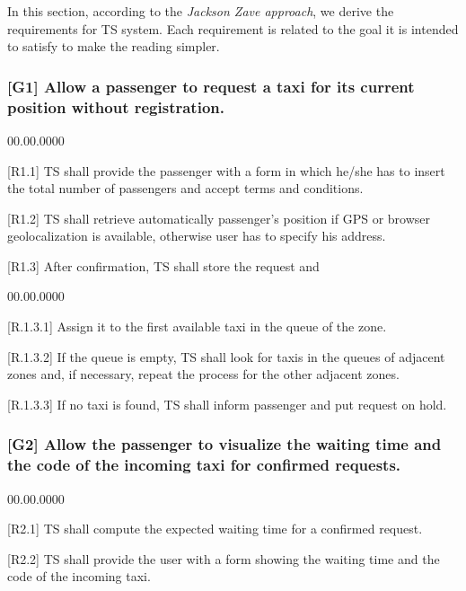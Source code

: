 In this section, according to the \emph{Jackson Zave approach}, we
derive the requirements for TS system. Each requirement is related
to the goal it is intended to satisfy to make the reading simpler.


\subsubsection{{[}G1{]} Allow a passenger to request a taxi for its current position
without registration.}
\begin{lyxlist}{00.00.0000}
\item [{{[}R1.1{]}}] TS shall provide the passenger with a form in which
he/she has to insert the total number of passengers and accept terms
and conditions.
\item [{{[}R1.2{]}}] TS shall retrieve automatically passenger's position
if GPS or browser geolocalization is available, otherwise user has
to specify his address.
\item [{{[}R1.3{]}}] After confirmation, TS shall store the request and 

\begin{lyxlist}{00.00.0000}
\item [{{[}R.1.3.1{]}}] Assign it to the first available taxi in the queue
of the zone. 
\item [{{[}R.1.3.2{]}}] If the queue is empty, TS shall look for taxis
in the queues of adjacent zones and, if necessary, repeat the process
for the other adjacent zones.
\item [{{[}R.1.3.3{]}}] If no taxi is found, TS shall inform passenger
and put request on hold.
\end{lyxlist}
\end{lyxlist}

\subsubsection{{[}G2{]} Allow the passenger to visualize the waiting time and the
code of the incoming taxi for confirmed requests.}
\begin{lyxlist}{00.00.0000}
\item [{{[}R2.1{]}}] TS shall compute the expected waiting time for a confirmed
request.
\item [{{[}R2.2{]}}] TS shall provide the user with a form showing the
waiting time and the code of the incoming taxi.
\end{lyxlist}

